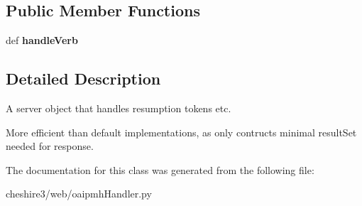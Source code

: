 \subsection*{Public Member Functions}
\begin{DoxyCompactItemize}
\item 
\hypertarget{classcheshire3_1_1web_1_1oaipmh_handler_1_1_minimal_resumption_server_a242729e4ba8670d260c85693820dd058}{def {\bfseries handle\-Verb}}\label{classcheshire3_1_1web_1_1oaipmh_handler_1_1_minimal_resumption_server_a242729e4ba8670d260c85693820dd058}

\end{DoxyCompactItemize}


\subsection{Detailed Description}
\begin{DoxyVerb}A server object that handles resumption tokens etc.

More efficient than default implementations, as only contructs minimal
resultSet needed for response.
\end{DoxyVerb}
 

The documentation for this class was generated from the following file\-:\begin{DoxyCompactItemize}
\item 
cheshire3/web/oaipmh\-Handler.\-py\end{DoxyCompactItemize}
